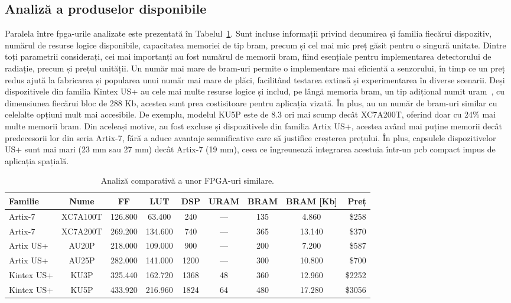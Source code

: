 \documentclass[12pt,a4paper]{report}
\begin{document}
\subsection{Analiză a produselor disponibile}
Paralela între \gls{fpga}-urile analizate este prezentată în Tabelul~\ref{tab:sw_fpga_comparison}. Sunt incluse informații privind denumirea și familia fiecărui dispozitiv, numărul de resurse logice disponibile, capacitatea memoriei de tip \gls{bram}, precum și cel mai mic preț găsit pentru o singură unitate. Dintre toți parametrii considerați, cei mai importanți au fost numărul de memorii \gls{bram}, fiind esențiale pentru implementarea detectorului de radiație, precum și prețul unității. Un număr mai mare de \gls{bram}-uri permite o implementare mai eficientă a senzorului, în timp ce un preț redus ajută la fabricarea și popularea unui număr mai mare de plăci, facilitând testarea extinsă și experimentarea în diverse scenarii. Deși dispozitivele din familia Kintex US+ au cele mai multe resurse logice și includ,  pe lângă memoria \gls{bram}, un tip adițional numit \gls{uram}~\cite{fpga_memory_types}, cu dimensiunea fiecărui bloc de 288 Kb, acestea sunt prea costisitoare pentru aplicația vizată. În plus, au un număr de \gls{bram}-uri similar cu celelalte opțiuni mult mai accesibile. De exemplu, modelul KU5P este de 8.3 ori mai scump decât XC7A200T, oferind doar cu 24\% mai multe memorii \gls{bram}. Din aceleași motive, au fost excluse și dispozitivele din familia Artix US+, acestea având mai puține memorii decât predecesorii lor din seria Artix-7, fără a aduce avantaje semnificative care să justifice creșterea prețului. În plus, capsulele dispozitivelor US+ sunt mai mari (23 mm sau 27 mm) decât Artix-7 (19 mm), ceea ce îngreunează integrarea acestuia într-un \gls{pcb} compact impus de aplicația spațială.

\begin{table}[ht!]
  \centering
  \renewcommand{\arraystretch}{1.6}
  \caption{Analiză comparativă a unor FPGA-uri similare.}%
  \label{tab:sw_fpga_comparison}
  \begin{tabular}{l c c c c c c c r}
    \toprule
    \textbf{Familie} & \textbf{Nume} & \textbf{FF} & \textbf{LUT} & \textbf{DSP} & \textbf{URAM} & \textbf{BRAM} & \textbf{BRAM [Kb]} & \textbf{Preț} \\
    \midrule
    Artix-7 & XC7A100T & 126.800 & 63.400 & 240 & --- & 135 & 4.860 & \$258 \\
    Artix-7 & XC7A200T & 269.200 & 134.600 & 740 & --- & 365 & 13.140 & \$370 \\
    \midrule
    Artix US+ & AU20P & 218.000 & 109.000 & 900 & --- & 200 & 7.200 & \$587 \\
    Artix US+ & AU25P & 282.000 & 141.000 & 1200 & --- & 300 & 10.800 & \$700 \\
    \midrule
    Kintex US+ & KU3P & 325.440 & 162.720 & 1368 & 48 & 360 & 12.960 & \$2252 \\
    Kintex US+ & KU5P & 433.920 & 216.960 & 1824 & 64 & 480 & 17.280 & \$3056 \\
    \bottomrule
  \end{tabular}
\end{table}
\end{document}
